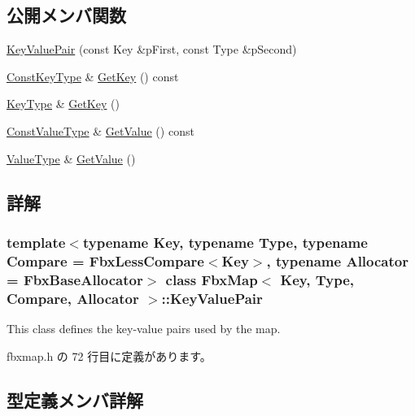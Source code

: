 \subsection*{公開メンバ関数}
\begin{DoxyCompactItemize}
\item 
\hyperlink{class_fbx_map_1_1_key_value_pair_ad6f068ce05b4e108a0218ffaa45c0994}{Key\+Value\+Pair} (const Key \&p\+First, const Type \&p\+Second)
\item 
\hyperlink{class_fbx_map_1_1_key_value_pair_a74738485dc0b74e76e09dfbcdca9e62e}{Const\+Key\+Type} \& \hyperlink{class_fbx_map_1_1_key_value_pair_a6e43d1f01dc25d31294138c4c60b3b11}{Get\+Key} () const
\item 
\hyperlink{class_fbx_map_1_1_key_value_pair_a5e685c6ff77cdf31f878e5105737c1a3}{Key\+Type} \& \hyperlink{class_fbx_map_1_1_key_value_pair_a68e18fe165bce40f21e0e18eef92978c}{Get\+Key} ()
\item 
\hyperlink{class_fbx_map_1_1_key_value_pair_a13d0030dcec9979f30273cc4ac6ed871}{Const\+Value\+Type} \& \hyperlink{class_fbx_map_1_1_key_value_pair_a42766d8323b96bc993df3f582ff35313}{Get\+Value} () const
\item 
\hyperlink{class_fbx_map_1_1_key_value_pair_a716c83c1f6dabf173132b5acde84a9fe}{Value\+Type} \& \hyperlink{class_fbx_map_1_1_key_value_pair_ab06a5a6b1f2d03ae14a98a91cdfac643}{Get\+Value} ()
\end{DoxyCompactItemize}


\subsection{詳解}
\subsubsection*{template$<$typename Key, typename Type, typename Compare = Fbx\+Less\+Compare$<$\+Key$>$, typename Allocator = Fbx\+Base\+Allocator$>$\newline
class Fbx\+Map$<$ Key, Type, Compare, Allocator $>$\+::\+Key\+Value\+Pair}

This class defines the key-\/value pairs used by the map. 

 fbxmap.\+h の 72 行目に定義があります。



\subsection{型定義メンバ詳解}
\mbox{\label{class_fbx_map_1_1_key_value_pair_a74738485dc0b74e76e09dfbcdca9e62e}} 
